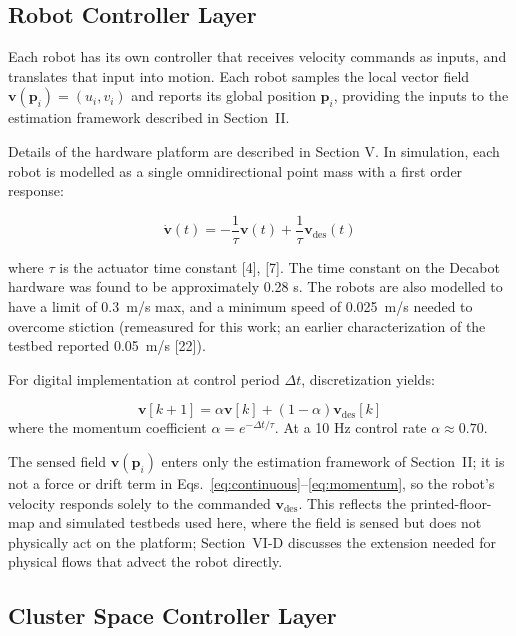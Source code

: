 \documentclass[lettersize,journal]{IEEEtran}
\begin{document}
\subsection{Robot Controller Layer}
\noindent 

Each robot has its own controller that receives velocity commands as inputs, and translates that input into motion. Each robot samples the local vector field $\mathbf{v}(\mathbf{p}_i) = (u_i, v_i)$ and reports its global position $\mathbf{p}_i$, providing the inputs to the estimation framework described in Section~II.

Details of the hardware platform are described in Section V.
In simulation, each robot is modelled as a single omnidirectional point mass with a first order response:

\begin{equation}
    \dot{\mathbf{v}}(t) = -\frac{1}{\tau}\mathbf{v}(t) + \frac{1}{\tau}\mathbf{v}_{\text{des}}(t)
    \label{eq:continuous}
    \end{equation}

where $\tau$ is the actuator time constant [4], [7]. The time constant on the Decabot hardware was found to be approximately 0.28 s.  The robots are also modelled to have a limit of 0.3~m/s max, and a minimum speed of 0.025~m/s needed to overcome stiction (remeasured for this work; an earlier characterization of the testbed reported 0.05~m/s [22]).

For digital implementation at control period $\Delta t$, discretization yields:

\begin{equation}
\mathbf{v}[k+1] = \alpha \mathbf{v}[k] + (1-\alpha)\mathbf{v}_{\text{des}}[k]
\label{eq:momentum}
\end{equation}
where the momentum coefficient $\alpha = e^{-\Delta t/\tau}$. At a 10 Hz control rate $\alpha \approx 0.70$.

The sensed field $\mathbf{v}(\mathbf{p}_i)$ enters only the estimation framework of Section~II; it is not a force or drift term in Eqs.~\eqref{eq:continuous}--\eqref{eq:momentum}, so the robot's velocity responds solely to the commanded $\mathbf{v}_{\text{des}}$. This reflects the printed-floor-map and simulated testbeds used here, where the field is sensed but does not physically act on the platform; Section~VI-D discusses the extension needed for physical flows that advect the robot directly.


\subsection{Cluster Space Controller Layer}
\end{document}
